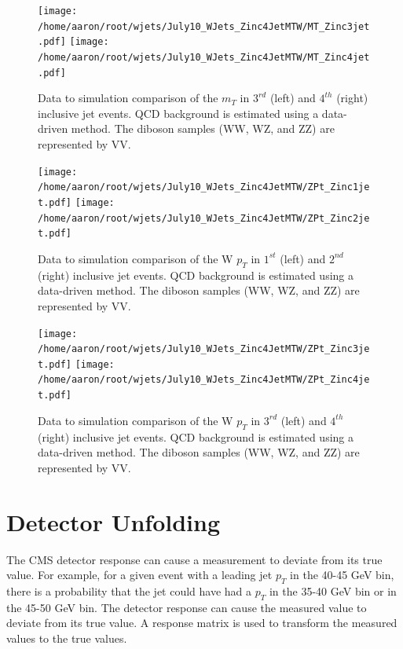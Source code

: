\documentclass[oneside, letterpaper, oldfontcommands]{memoir}
\begin{document}
\begin{figure}[!Hhtbp]
\begin{center}
\texttt{[image: /home/aaron/root/wjets/July10\_WJets\_Zinc4JetMTW/MT\_Zinc3jet.pdf]}
\texttt{[image: /home/aaron/root/wjets/July10\_WJets\_Zinc4JetMTW/MT\_Zinc4jet.pdf]}
\end{center}
\caption{Data to simulation comparison of the $m_{T}$ in  $3^{rd}$ (left) and $4^{th}$ (right) inclusive jet events. QCD background is estimated using a data-driven method. The diboson samples (WW, WZ, and ZZ) are represented by VV.}
\label{eta34}
\end{figure}

\begin{figure}[!Hhtbp]
\begin{center}
\texttt{[image: /home/aaron/root/wjets/July10\_WJets\_Zinc4JetMTW/ZPt\_Zinc1jet.pdf]}
\texttt{[image: /home/aaron/root/wjets/July10\_WJets\_Zinc4JetMTW/ZPt\_Zinc2jet.pdf]}
\end{center}
\caption{Data to simulation comparison of the W $p_{T}$ in $1^{st}$ (left) and $2^{nd}$ (right) inclusive jet events. QCD background is estimated using a data-driven method. The diboson samples (WW, WZ, and ZZ) are represented by VV.}
\label{eta12}
\end{figure}

\begin{figure}[!Hhtbp]
\begin{center}
\texttt{[image: /home/aaron/root/wjets/July10\_WJets\_Zinc4JetMTW/ZPt\_Zinc3jet.pdf]}
\texttt{[image: /home/aaron/root/wjets/July10\_WJets\_Zinc4JetMTW/ZPt\_Zinc4jet.pdf]}
\end{center}
\caption{Data to simulation comparison of the W $p_{T}$ in  $3^{rd}$ (left) and $4^{th}$ (right) inclusive jet events. QCD background is estimated using a data-driven method. The diboson samples (WW, WZ, and ZZ) are represented by VV.}
\label{eta34}
\end{figure}
\section{Detector Unfolding}
\qquad The CMS detector response can cause a measurement to deviate from its true value. For example, for a given event with a leading jet $p_{T}$ in the 40-45 GeV bin, there is a probability that the jet could have had a $p_{T}$ in the 35-40 GeV bin or in the 45-50 GeV bin. The detector response can cause the measured value to deviate from its true value. A response matrix is used to transform the measured values to the true values. 
\end{document}
